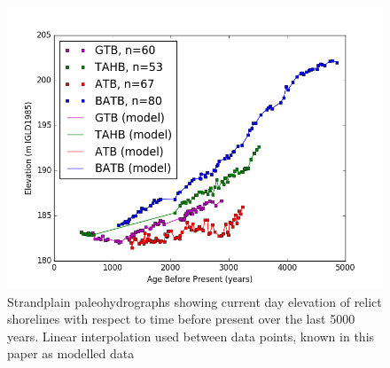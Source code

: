 \begin{figure}[h]
	\includegraphics[width=1.1\linewidth]{data/theData.png}
	\caption{Strandplain paleohydrographs showing current day elevation of relict shorelines with respect to time before present over the last 5000 years. Linear interpolation used between data points, known in this paper as modelled data}
	\label{fig:rawDataWithModel}
\end{figure}
\newpage
%
